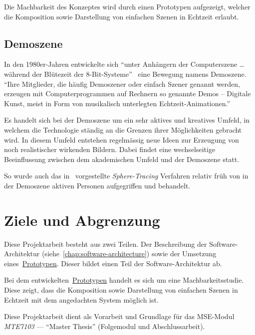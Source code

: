 Die Machbarkeit des Konzeptes wird durch einen Prototypen aufgezeigt, welcher
die Komposition sowie Darstellung von einfachen Szenen in Echtzeit erlaubt.

\subsection{Demoszene}
\label{subsec:demoscene}

In den 1980er-Jahren entwickelte sich ``unter Anhängern der
Computerszene \dots{} während der Blütezeit der
8-Bit-Systeme''~\parencite{wikipedia_foundation_demoszene_2015} eine Bewegung
namens Demoszene. ``Ihre Mitglieder, die häufig Demoszener oder einfach
Szener genannt werden, erzeugen mit Computerprogrammen auf Rechnern so
genannte Demos – Digitale Kunst, meist in Form von musikalisch
unterlegten
Echtzeit-Animationen.''~\parencite{wikipedia_foundation_demoszene_2015}

Es handelt sich bei der Demoszene um ein sehr aktives und kreatives
Umfeld, in welchem die Technologie ständig an die Grenzen ihrer
Möglichkeiten gebracht wird. In diesem Umfeld entstehen regelmässig neue
Ideen zur Erzeugung von noch realistischer wirkenden Bildern. Dabei
findet eine wechselseitige Beeinflussung zwischen dem akademischen
Umfeld und der Demoszene statt.

So wurde auch das in~\cite{osterwalder_sven_volume_2016} vorgestellte
\textit{Sphere-Tracing} Verfahren
relativ früh von in der Demoszene aktiven Personen aufgegriffen und
behandelt.

\section{Ziele und Abgrenzung}
\label{sec:objectives}

Diese Projektarbeit besteht aus zwei Teilen. Der Beschreibung der
Software-Architektur (siehe~\autoref{chap:software-architecture}) sowie der Umsetzung
eines~\hyperref[chap:prototype]{Prototypen}. Dieser bildet einen Teil der
Software-Architektur ab.

Bei dem entwickelten~\hyperref[chap:prototype]{Prototypen} handelt es sich um
eine Machbarkeitsstudie. Diese zeigt, dass die Komposition sowie Darstellung
von einfachen Szenen in Echtzeit mit dem angedachten System möglich ist.

Diese Projektarbeit dient als Vorarbeit und Grundlage für das MSE-Modul
\textit{MTE7103} --- ``Master Thesis'' (Folgemodul und Abschlussarbeit).

